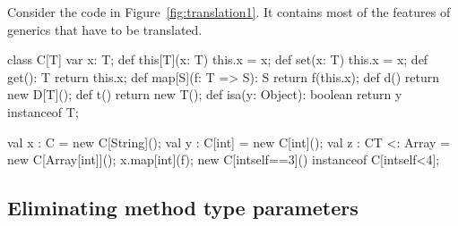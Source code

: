 \documentclass[preprint,nocopyrightspace,9pt]{sigplanconf}
\begin{document}
Consider the code in Figure~\ref{fig:translation1}.  It contains most of the
features of generics that have to be translated.
\begin{figure*}[tp]
\begin{xten}
class C[T] {
    var x: T;
    def this[T](x: T) { this.x = x; }
    def set(x: T) { this.x = x; }
    def get(): T { return this.x; }
    def map[S](f: T => S): S { return f(this.x); }
    def d() { return new D[T](); }
    def t() { return new T(); }
    def isa(y: Object): boolean { return y instanceof T; }
}

val x : C = new C[String]();
val y : C[int] = new C[int]();
val z : C{T <: Array} = new C[Array[int]]();
x.map[int](f);
new C[int{self==3}]() instanceof C[int{self<4}];
\end{xten}
\caption{Code to translate}
\label{fig:translation1}
\end{figure*}

\subsection{Eliminating method type parameters}

\begin{figure*}[tp]
\caption{After removing method parameters}
\label{fig:translation2}
\end{figure*}
\end{document}
